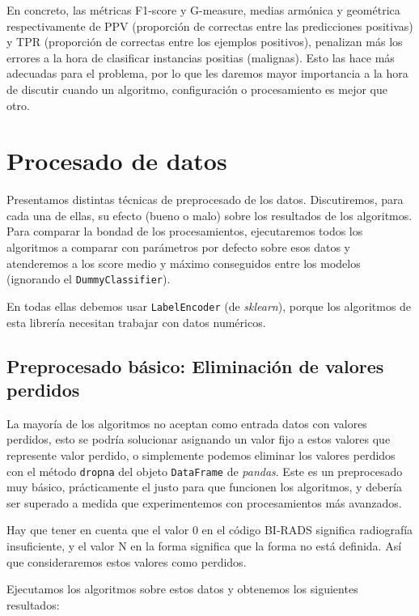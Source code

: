 \documentclass{article}
\begin{document}
En concreto, las métricas F1-score y G-measure, medias armónica y
geométrica respectivamente de PPV (proporción de correctas entre las
predicciones positivas) y TPR (proporción de correctas entre los
ejemplos positivos), penalizan más los errores a la hora de clasificar
instancias positias (malignas). Esto las hace más adecuadas para el
problema, por lo que les daremos mayor importancia a la hora de
discutir cuando un algoritmo, configuración o procesamiento es mejor
que otro.

\section{Procesado de datos}

Presentamos distintas técnicas de preprocesado de los
datos. Discutiremos, para cada una de ellas, su efecto (bueno o malo)
sobre los resultados de los algoritmos. Para comparar la bondad de los
procesamientos, ejecutaremos todos los algoritmos a comparar con
parámetros por defecto sobre esos datos y atenderemos a los score
medio y máximo conseguidos entre los modelos (ignorando el
\texttt{DummyClassifier}).

En todas ellas debemos usar \texttt{LabelEncoder} (de
\textit{sklearn}), porque los algoritmos de esta librería necesitan
trabajar con datos numéricos.

\subsection{Preprocesado básico: Eliminación de valores perdidos}

La mayoría de los algoritmos no aceptan como entrada datos con valores
perdidos, esto se podría solucionar asignando un valor fijo a estos
valores que represente valor perdido, o simplemente podemos eliminar
los valores perdidos con el método \texttt{dropna} del objeto
\texttt{DataFrame} de \textit{pandas}. Este es un preprocesado muy
básico, prácticamente el justo para que funcionen los algoritmos, y
debería ser superado a medida que experimentemos con procesamientos
más avanzados.

Hay que tener en cuenta que el valor 0 en el código BI-RADS significa
radiografía insuficiente, y el valor N en la forma significa que la
forma no está definida. Así que consideraremos estos valores como
perdidos.

Ejecutamos los algoritmos sobre estos datos y obtenemos los siguientes
resultados:
\end{document}
